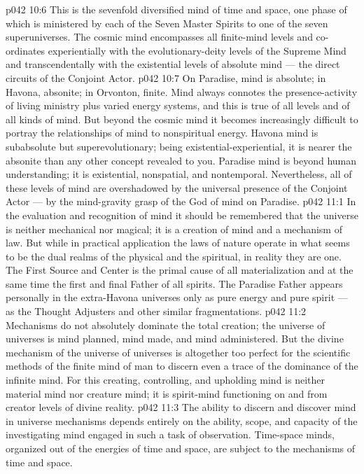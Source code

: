 \vs p042 10:6 \pc {} This is the sevenfold diversified mind of time and space, one phase of which is ministered by each of the Seven Master Spirits to one of the seven superuniverses. The cosmic mind encompasses all finite\hyp{}mind levels and co\hyp{}ordinates experientially with the evolutionary\hyp{}deity levels of the Supreme Mind and transcendentally with the existential levels of absolute mind --- the direct circuits of the Conjoint Actor.
\vs p042 10:7 On Paradise, mind is absolute; in Havona, absonite; in Orvonton, finite. Mind always connotes the presence\hyp{}activity of living ministry plus varied energy systems, and this is true of all levels and of all kinds of mind. But beyond the cosmic mind it becomes increasingly difficult to portray the relationships of mind to nonspiritual energy. Havona mind is subabsolute but superevolutionary; being existential\hyp{}experiential, it is nearer the absonite than any other concept revealed to you. Paradise mind is beyond human understanding; it is existential, nonspatial, and nontemporal. Nevertheless, all of these levels of mind are overshadowed by the universal presence of the Conjoint Actor --- by the mind\hyp{}gravity grasp of the God of mind on Paradise.
\vs p042 11:1 In the evaluation and recognition of mind it should be remembered that the universe is neither mechanical nor magical; it is a creation of mind and a mechanism of law. But while in practical application the laws of nature operate in what seems to be the dual realms of the physical and the spiritual, in reality they are one. The First Source and Center is the primal cause of all materialization and at the same time the first and final Father of all spirits. The Paradise Father appears personally in the extra\hyp{}Havona universes only as pure energy and pure spirit --- as the Thought Adjusters and other similar fragmentations.
\vs p042 11:2 \pc Mechanisms do not absolutely dominate the total creation; the universe of universes  is mind planned, mind made, and mind administered. But the divine mechanism of the universe of universes is altogether too perfect for the scientific methods of the finite mind of man to discern even a trace of the dominance of the infinite mind. For this creating, controlling, and upholding mind is neither material mind nor creature mind; it is spirit\hyp{}mind functioning on and from creator levels of divine reality.
\vs p042 11:3 The ability to discern and discover mind in universe mechanisms depends entirely on the ability, scope, and capacity of the investigating mind engaged in such a task of observation. Time\hyp{}space minds, organized out of the energies of time and space, are subject to the mechanisms of time and space.
